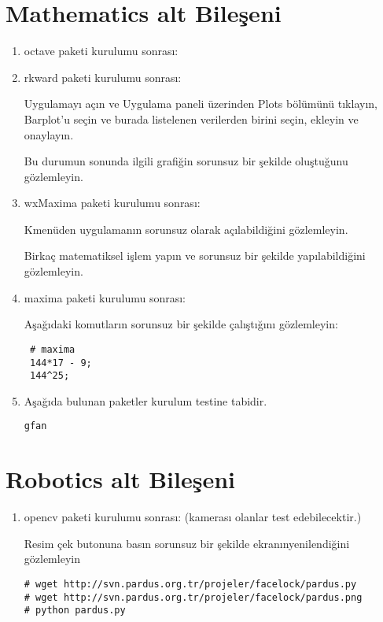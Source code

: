\documentclass[a4paper,10pt]{article}
\begin{document}
\section{Mathematics alt Bileşeni}
\begin{enumerate}
\item octave paketi kurulumu sonrası:

\item rkward paketi kurulumu sonrası:

Uygulamayı açın ve Uygulama paneli üzerinden Plots bölümünü tıklayın, Barplot'u seçin ve burada listelenen verilerden birini seçin, ekleyin ve onaylayın. 

Bu durumun sonunda ilgili grafiğin sorunsuz bir şekilde oluştuğunu gözlemleyin.

\item wxMaxima paketi kurulumu sonrası:

Kmenüden uygulamanın sorunsuz olarak açılabildiğini gözlemleyin.

Birkaç matematiksel işlem yapın ve sorunsuz bir şekilde yapılabildiğini gözlemleyin.
\item maxima paketi kurulumu sonrası:

Aşağıdaki komutların sorunsuz bir şekilde çalıştığını gözlemleyin:
\begin{verbatim}
 # maxima
 144*17 - 9;
 144^25;
\end{verbatim}

\item Aşağıda bulunan paketler kurulum testine tabidir.
\begin{verbatim}
gfan 
\end{verbatim}

\end{enumerate}

\section{Robotics alt Bileşeni}
\begin{enumerate}
 \item opencv paketi kurulumu sonrası: (kamerası olanlar test edebilecektir.)

Resim çek butonuna basın sorunsuz bir şekilde ekranınyenilendiğini gözlemleyin
\begin{verbatim}
# wget http://svn.pardus.org.tr/projeler/facelock/pardus.py
# wget http://svn.pardus.org.tr/projeler/facelock/pardus.png
# python pardus.py
\end{verbatim}


\end{enumerate}
\end{document}
